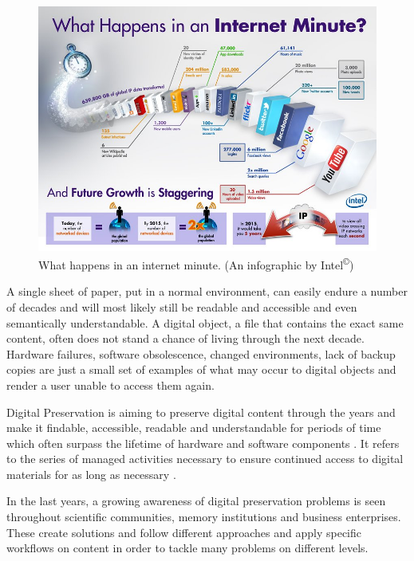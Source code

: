 \begin{figure}[th]
\begin{center}
\includegraphics[width=6in]{figures/introduction/intel_oneminute_internet.jpg}
\caption{What happens in an internet minute. (An infographic by Intel\textsuperscript{\copyright})}
\label{fig:intel_oneminute_internet}
\end{center}
\end{figure}

A single sheet of paper, put in a normal environment, can easily endure a number of decades and will most likely still be readable and accessible and even semantically understandable. A digital object, a file that contains the exact same content, often does not stand a chance of living through the next decade. Hardware failures, software obsolescence, changed environments, lack of backup copies are just a small set of examples of what may occur to digital objects and render a user unable to access them again.

Digital Preservation is aiming to preserve digital content through the years and make it findable, accessible, readable and understandable for periods of time which often surpass the lifetime of hardware and software components \cite{DBLP:journals/dlib/RosenthalRLRM05}. It refers to the series of managed activities necessary to ensure continued access to digital materials for as long as necessary \cite{dpchandbook}.

In the last years, a growing awareness of digital preservation problems is seen throughout scientific communities, memory institutions and business enterprises. These create solutions and follow different approaches and apply specific workflows on content in order to tackle many problems on different levels.

